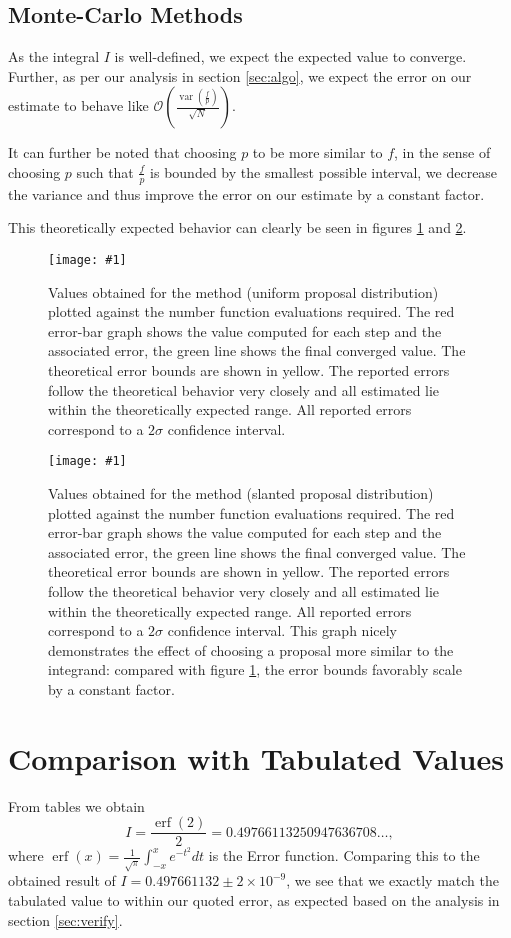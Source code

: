 \documentclass[10pt, a4paper]{article}
\newcommand{\plot}[3]{\begin{figure}[ht]\centering\texttt{[image: \#1]}\caption{#2}\label{#3}\end{figure}}
\newcommand{\final}{$I = 0.497661132 \pm 2\times10^{-9}$}
\begin{document}
  \subsection{Monte-Carlo Methods}
  As the integral $I$ is well-defined, we expect the expected value to converge. Further, as per our
  analysis in section \ref{sec:algo}, we expect the error on our estimate to behave like
  $\mathcal{O}\left( \frac{\operatorname{var}(\frac fp)}{\sqrt N} \right)$.

  It can further be noted that choosing $p$ to be more similar to $f$, in the sense of choosing $p$
  such that $\frac fp$ is bounded by the smallest possible interval, we decrease the variance and thus
  improve the error on our estimate by a constant factor.

  This theoretically expected behavior can clearly be seen in figures \ref{fig:mont-flat} and
  \ref{fig:mont-slant}.

  \plot{proj-mont-flat-accuracy}{
    Values obtained for the \is{} method (uniform proposal distribution) plotted against the number
    function evaluations required. The red
    error-bar graph shows the value computed for each step and the associated error, the green line
    shows the final converged value. The theoretical error bounds are shown in yellow. The reported errors
    follow the theoretical behavior very closely and all estimated lie within the theoretically expected range.
    All reported errors correspond to a $2\sigma$ confidence interval.
  }{fig:mont-flat}

  \plot{proj-mont-slanted-accuracy}{
    Values obtained for the \is{} method (slanted proposal distribution) plotted against the number
    function evaluations required. The red
    error-bar graph shows the value computed for each step and the associated error, the green line
    shows the final converged value. The theoretical error bounds are shown in yellow. The reported errors
    follow the theoretical behavior very closely and all estimated lie within the theoretically expected range.
    All reported errors correspond to a $2\sigma$ confidence interval. This graph nicely demonstrates the
    effect of choosing a proposal more similar to the integrand: compared with figure \ref{fig:mont-flat},
    the error bounds favorably scale by a constant factor.
  }{fig:mont-slant}

{}


\appendix{}

\section{Comparison with Tabulated Values}
\label{app:cheat}
From tables we obtain
\begin{equation}
I = \frac{\operatorname{erf}(2)}{2} = 0.49766113250947636708 \dots,
\end{equation}
where $\operatorname{erf}(x) = \frac{1}{\sqrt\pi}\int_{-x}^x e^{-t^2} dt$ is the Error function. Comparing
this to the obtained result of \final, we see that we exactly match the tabulated value to within our
quoted error, as expected based on the analysis in section \ref{sec:verify}.
\end{document}
